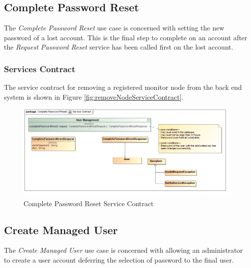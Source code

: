 \subsection{Complete Password Reset}
The \textit{Complete Password Reset} use case is concerned with setting the
new password of a lost account. This is the final step to complete on an account
after the \textit{Request Password Reset} service has been called first on the
lost account.

\subsubsection{Services Contract}
The service contract for removing a registered monitor node from the back end 
system is shown in Figure \ref{fig:removeNodeServiceContract}.
\begin{figure}[H]
  \begin{center}
  \includegraphics[scale=0.4]{../Diagrams and Charts/User Management/Complete Password Reset Service Contract.jpg}
  \caption{Complete Password Reset Service Contract}
  \label{fig:completePasswordResetServicesContract}
  \end{center}  
\end{figure}



\subsection{Create Managed User}
The \textit{Create Managed User} use case is concerned with allowing an
administrator to create a user account deferring the selection of password to the
final user.

